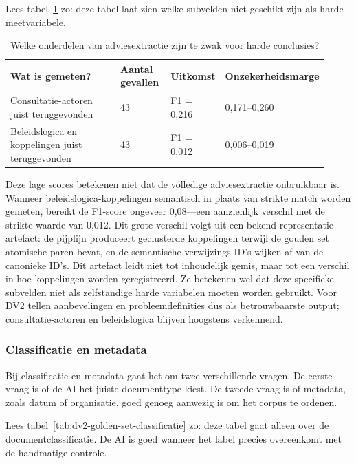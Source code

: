 Lees tabel~\ref{tab:dv2-golden-set-adviesextractie-subvelden} zo: deze tabel laat zien welke subvelden niet geschikt zijn als harde meetvariabele.

\begin{table}[htbp]
\centering
\small
\caption{Welke onderdelen van adviesextractie zijn te zwak voor harde conclusies?}
\label{tab:dv2-golden-set-adviesextractie-subvelden}
\begin{tabular}{p{0.38\linewidth}p{0.16\linewidth}p{0.16\linewidth}p{0.22\linewidth}}
\hline
Wat is gemeten? & Aantal gevallen & Uitkomst & Onzekerheidsmarge \\
\hline
Consultatie-actoren juist teruggevonden & 43 & F1 = 0,216 & 0,171--0,260 \\
Beleidslogica en koppelingen juist teruggevonden & 43 & F1 = 0,012 & 0,006--0,019 \\
\hline
\end{tabular}
\end{table}

Deze lage scores betekenen niet dat de volledige adviesextractie onbruikbaar is. Wanneer beleidslogica-koppelingen semantisch in plaats van strikte match worden gemeten, bereikt de F1-score ongeveer 0,08---een aanzienlijk verschil met de strikte waarde van 0,012. Dit grote verschil volgt uit een bekend representatie-artefact: de pijplijn produceert geclusterde koppelingen terwijl de gouden set atomische paren bevat, en de semantische verwijzings-ID's wijken af van de canonieke ID's. Dit artefact leidt niet tot inhoudelijk gemis, maar tot een verschil in hoe koppelingen worden geregistreerd. Ze betekenen wel dat deze specifieke subvelden niet als zelfstandige harde variabelen moeten worden gebruikt. Voor DV2 tellen aanbevelingen en probleemdefinities dus als betrouwbaarste output; consultatie-actoren en beleidslogica blijven hoogstens verkennend.

\subsubsection{Classificatie en metadata}
\label{subsubsec:dv2-golden-classificatie-metadata}

Bij classificatie en metadata gaat het om twee verschillende vragen. De eerste vraag is of de AI het juiste documenttype kiest. De tweede vraag is of metadata, zoals datum of organisatie, goed genoeg aanwezig is om het corpus te ordenen.

Lees tabel~\ref{tab:dv2-golden-set-classificatie} zo: deze tabel gaat alleen over de documentclassificatie. De AI is goed wanneer het label precies overeenkomt met de handmatige controle.


